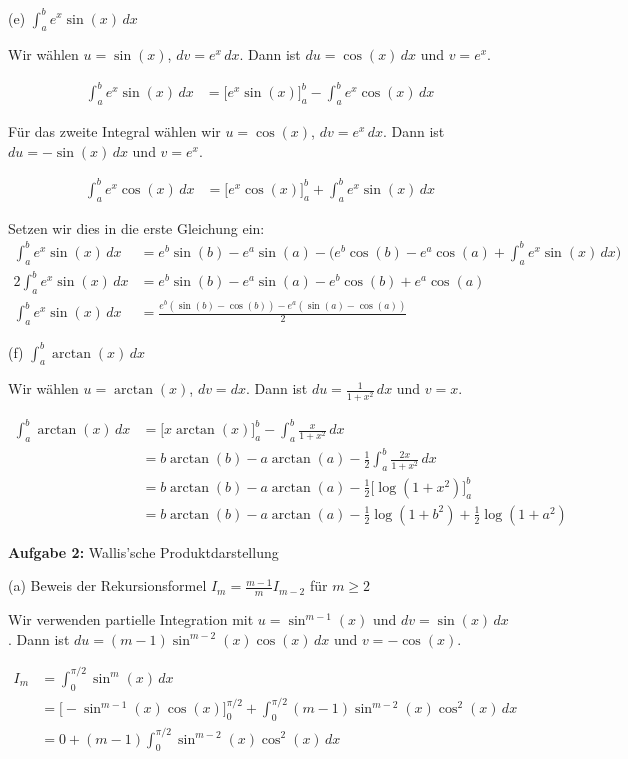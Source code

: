 \documentclass{article}
\begin{document}
(e) $\int_a^b e^x\sin(x)\,dx$

Wir wählen $u = \sin(x)$, $dv = e^x\,dx$. Dann ist $du = \cos(x)\,dx$ und $v = e^x$.

\begin{align}
\int_a^b e^x\sin(x)\,dx &= \Big[e^x\sin(x)\Big]_a^b - \int_a^b e^x\cos(x)\,dx
\end{align}

Für das zweite Integral wählen wir $u = \cos(x)$, $dv = e^x\,dx$. Dann ist $du = -\sin(x)\,dx$ und $v = e^x$.

\begin{align}
\int_a^b e^x\cos(x)\,dx &= \Big[e^x\cos(x)\Big]_a^b + \int_a^b e^x\sin(x)\,dx
\end{align}

Setzen wir dies in die erste Gleichung ein:
\begin{align}
\int_a^b e^x\sin(x)\,dx &= e^b\sin(b) - e^a\sin(a) - \Big(e^b\cos(b) - e^a\cos(a) + \int_a^b e^x\sin(x)\,dx\Big) \\
2\int_a^b e^x\sin(x)\,dx &= e^b\sin(b) - e^a\sin(a) - e^b\cos(b) + e^a\cos(a) \\
\int_a^b e^x\sin(x)\,dx &= \frac{e^b(\sin(b) - \cos(b)) - e^a(\sin(a) - \cos(a))}{2}
\end{align}

(f) $\int_a^b \arctan(x)\,dx$

Wir wählen $u = \arctan(x)$, $dv = dx$. Dann ist $du = \frac{1}{1+x^2}\,dx$ und $v = x$.

\begin{align}
\int_a^b \arctan(x)\,dx &= \Big[x\arctan(x)\Big]_a^b - \int_a^b \frac{x}{1+x^2}\,dx \\
&= b\arctan(b) - a\arctan(a) - \frac{1}{2}\int_a^b \frac{2x}{1+x^2}\,dx \\
&= b\arctan(b) - a\arctan(a) - \frac{1}{2}\Big[\log(1+x^2)\Big]_a^b \\
&= b\arctan(b) - a\arctan(a) - \frac{1}{2}\log(1+b^2) + \frac{1}{2}\log(1+a^2)
\end{align}

\textbf{Aufgabe 2:} Wallis'sche Produktdarstellung

(a) Beweis der Rekursionsformel $I_m = \frac{m-1}{m}I_{m-2}$ für $m \geq 2$

Wir verwenden partielle Integration mit $u = \sin^{m-1}(x)$ und $dv = \sin(x)\,dx$. 
Dann ist $du = (m-1)\sin^{m-2}(x)\cos(x)\,dx$ und $v = -\cos(x)$.

\begin{align}
I_m &= \int_0^{\pi/2} \sin^m(x)\,dx \\
&= \Big[-\sin^{m-1}(x)\cos(x)\Big]_0^{\pi/2} + \int_0^{\pi/2} (m-1)\sin^{m-2}(x)\cos^2(x)\,dx \\
&= 0 + (m-1)\int_0^{\pi/2} \sin^{m-2}(x)\cos^2(x)\,dx
\end{align}
\end{document}
